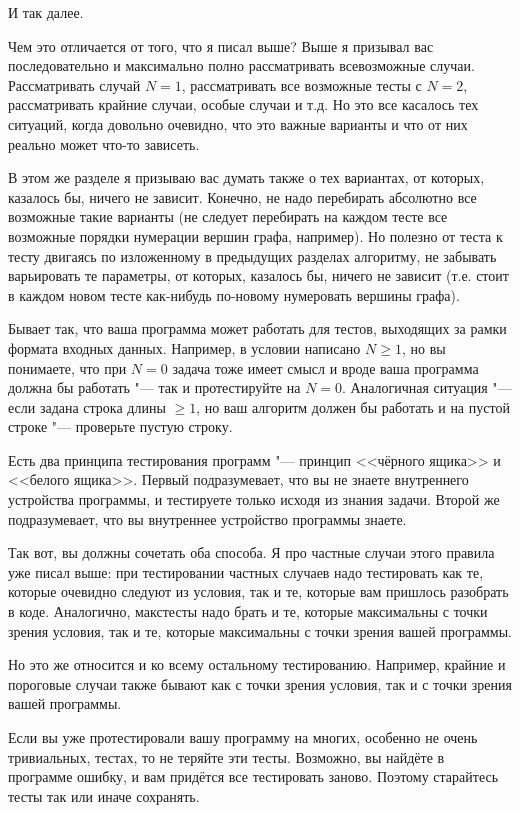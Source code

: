 \documentclass[a4paper,10pt]{problems}
\begin{document}
И так далее.

Чем это отличается от того, что я писал выше? Выше я призывал вас последовательно и максимально полно рассматривать всевозможные случаи. 
Рассматривать случай $N=1$, рассматривать все возможные тесты с $N=2$, рассматривать крайние случаи, особые случаи и т.д. 
Но это все касалось тех ситуаций, когда довольно очевидно, что это важные варианты и что от них реально может что-то зависеть.

В этом же разделе я призываю вас думать также о тех вариантах, от которых, казалось бы, ничего не зависит. 
Конечно, не надо перебирать абсолютно все возможные такие варианты (не следует перебирать на каждом тесте все возможные порядки нумерации вершин графа, например). 
Но полезно от теста к тесту двигаясь по изложенному в предыдущих разделах алгоритму, не забывать варьировать те параметры, от которых, казалось бы,
ничего не зависит (т.е. стоит в каждом новом тесте как-нибудь по-новому нумеровать вершины графа).

Бывает так, что ваша программа может работать для тестов, выходящих за рамки формата входных данных.
Например, в условии написано $N\geq 1$, но вы понимаете, что при $N=0$ задача тоже имеет смысл и вроде ваша программа должна бы работать "---
так и протестируйте на $N=0$.  
Аналогичная ситуация "--- если задана строка длины $\geq 1$, но ваш алгоритм должен бы работать и на пустой строке "--- проверьте пустую строку.

 Есть два принципа тестирования программ "--- принцип <<чёрного ящика>> и <<белого ящика>>. 
Первый подразумевает, что вы не знаете внутреннего устройства программы, и тестируете только исходя из знания задачи. 
Второй же подразумевает, что вы внутреннее устройство программы знаете.

Так вот, вы должны сочетать оба способа. 
Я про частные случаи этого правила уже писал выше: при тестировании частных случаев надо тестировать как те, которые очевидно следуют из условия,
так и те, которые вам пришлось разобрать в коде.
Аналогично, макстесты надо брать и те, которые максимальны с точки зрения условия, так и те, которые максимальны с точки зрения вашей программы.

Но это же относится и ко всему остальному тестированию. 
Например, крайние и пороговые случаи также бывают как с точки зрения условия, так и с точки зрения вашей программы.

 Если вы уже протестировали вашу программу на многих, особенно не очень тривиальных, тестах, то не теряйте эти тесты. 
Возможно, вы найдёте в программе ошибку, и вам придётся все тестировать заново. Поэтому старайтесь тесты так или иначе сохранять.
\end{document}
